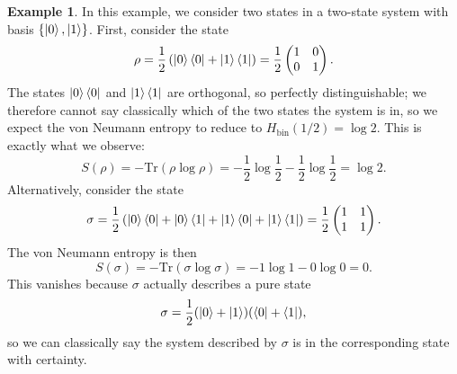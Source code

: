 \documentclass[12pt,a4paper]{report}
\numberwithin{equation}{section}
\newcommand{\ketbra}[2]{\ket{#1}\bra{#2}}
\newcommand{\ketbras}[1]{\ketbra{#1}{#1}}
\newcommand{\tr}{\text{Tr}}
\theoremstyle{definition}
\theoremstyle{theorem}
\theoremstyle{theorem}
\theoremstyle{example}
\newtheorem{example}{Example}[section]
\theoremstyle{definition}
\begin{document}
\begin{example}
	In this example, we consider two states in a two-state system with basis $\{\ket{0},\ket{1}\}$. First, consider the state
	\begin{equation}
		\rho=\frac{1}{2}\left(\ketbras{0}+\ketbras{1}\right)=\frac{1}{2}\begin{pmatrix}
			1&0\\0&1
		\end{pmatrix}.
	\end{equation}
	The states $\ketbras{0}$ and $\ketbras{1}$ are orthogonal, so perfectly distinguishable; we therefore cannot say classically which of the two states the system is in, so we expect the von Neumann entropy to reduce to $H_{\text{bin}}(1/2)=\log{2}$. This is exactly what we observe:
	\begin{equation}
		S(\rho)=-\tr(\rho\log\rho)=-\frac{1}{2}\log\frac{1}{2}-\frac{1}{2}\log\frac{1}{2}=\log{2}.
	\end{equation}
	Alternatively, consider the state
	\begin{equation}
		\sigma=\frac{1}{2}\left(\ketbras{0}+\ketbra{0}{1}+\ketbra{1}{0}+\ketbras{1}\right)=\frac{1}{2}\begin{pmatrix}
			1&1\\1&1
		\end{pmatrix}.
	\end{equation}
	The von Neumann entropy is then
	\begin{equation}
		S(\sigma)=-\tr(\sigma\log\sigma)=-1\log{1}-0\log{0}=0.
	\end{equation}
	This vanishes because $\sigma$ actually describes a pure state
	\begin{equation}
		\sigma=\frac{1}{2}(\ket{0}+\ket{1})(\bra{0}+\bra{1}),
	\end{equation}
	so we can classically say the system described by $\sigma$ is in the corresponding state with certainty.
\end{example}
\end{document}
